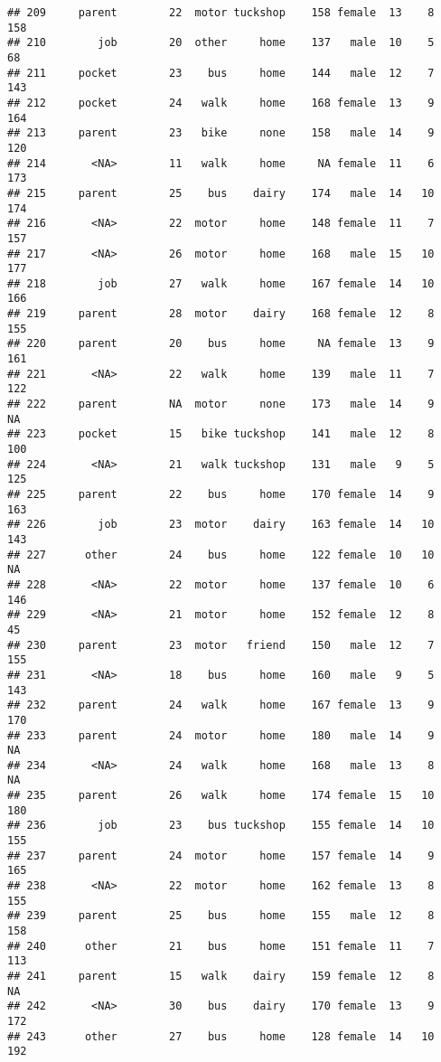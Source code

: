 \documentclass[
]{article}
\begin{document}
\begin{verbatim}
## 209     parent        22  motor tuckshop    158 female  13    8     158
## 210        job        20  other     home    137   male  10    5      68
## 211     pocket        23    bus     home    144   male  12    7     143
## 212     pocket        24   walk     home    168 female  13    9     164
## 213     parent        23   bike     none    158   male  14    9     120
## 214       <NA>        11   walk     home     NA female  11    6     173
## 215     parent        25    bus    dairy    174   male  14   10     174
## 216       <NA>        22  motor     home    148 female  11    7     157
## 217       <NA>        26  motor     home    168   male  15   10     177
## 218        job        27   walk     home    167 female  14   10     166
## 219     parent        28  motor    dairy    168 female  12    8     155
## 220     parent        20    bus     home     NA female  13    9     161
## 221       <NA>        22   walk     home    139   male  11    7     122
## 222     parent        NA  motor     none    173   male  14    9      NA
## 223     pocket        15   bike tuckshop    141   male  12    8     100
## 224       <NA>        21   walk tuckshop    131   male   9    5     125
## 225     parent        22    bus     home    170 female  14    9     163
## 226        job        23  motor    dairy    163 female  14   10     143
## 227      other        24    bus     home    122 female  10   10      NA
## 228       <NA>        22  motor     home    137 female  10    6     146
## 229       <NA>        21  motor     home    152 female  12    8      45
## 230     parent        23  motor   friend    150   male  12    7     155
## 231       <NA>        18    bus     home    160   male   9    5     143
## 232     parent        24   walk     home    167 female  13    9     170
## 233     parent        24  motor     home    180   male  14    9      NA
## 234       <NA>        24   walk     home    168   male  13    8      NA
## 235     parent        26   walk     home    174 female  15   10     180
## 236        job        23    bus tuckshop    155 female  14   10     155
## 237     parent        24  motor     home    157 female  14    9     165
## 238       <NA>        22  motor     home    162 female  13    8     155
## 239     parent        25    bus     home    155   male  12    8     158
## 240      other        21    bus     home    151 female  11    7     113
## 241     parent        15   walk    dairy    159 female  12    8      NA
## 242       <NA>        30    bus    dairy    170 female  13    9     172
## 243      other        27    bus     home    128 female  14   10     192

\end{verbatim}
\end{document}
